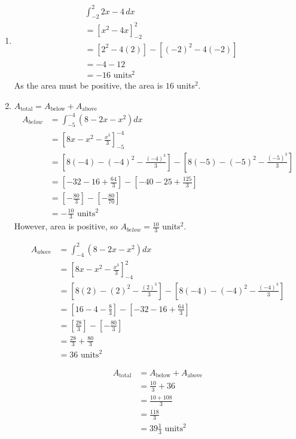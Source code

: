\begin{enumerate}
	\item
	\begin{align*}
		&\int_{-2}^{2} 2x-4 \, dx\\
		&=\left[ x^2-4x \right]_{-2}^2\\
		&=\left[ 2^2-4\left(2\right) \right] - \left[ \left(-2\right)^2-4\left(-2\right) \right]\\
		&=-4-12\\
		&=-16 \text{ units}^2
	\end{align*}
	As the area must be positive, the area is $16$ units$^2$.
	
	\item
	$A_{\text{total}} = A_{\text{below}} + A_{\text{above}}$
	\begin{align*}
		A_{below} &= \int_{-5}^{-4} (8-2x-x^2) dx\\
		&= \left[ 8x-x^2-\frac{x^3}{3} \right]_{-5}^{-4}\\
		&= \left[ 8\left(-4\right) - \left(-4\right)^2 - \frac{(-4)^3}{3} \right] - \left[ 8\left(-5\right) - \left(-5\right)^2 - \frac{(-5)^3}{3} \right]\\
		&= \left[ -32-16 + \frac{64}{3} \right] - \left[ -40-25 + \frac{125}{3} \right]\\
		&= \left[ -\frac{80}{3} \right] - \left[ -\frac{80}{70}\right]\\
		&= -\frac{10}{3} \text{ units}^2
	\end{align*}
	However, area is positive, so $A_{below} = \frac{10}{3}$ units$^2$.
	
	\begin{align*}
		A_{above} &= \int_{-4}^{2} (8-2x-x^2) dx\\
		&= \left[ 8x-x^2-\frac{x^3}{3} \right]_{-4}^{2}\\
		&= \left[ 8\left(2\right) - \left(2\right)^2 - \frac{(2)^3}{3} \right] - \left[ 8\left(-4\right) - \left(-4\right)^2 - \frac{(-4)^3}{3} \right]\\
		&= \left[ 16-4 - \frac{8}{3} \right] - \left[ -32-16 + \frac{64}{3} \right]\\
		&= \left[ \frac{28}{3} \right] - \left[ -\frac{80}{3}\right]\\
		&= \frac{28}{3} + \frac{80}{3}\\
		&= 36 \text{ units}^2
	\end{align*}
	
	\begin{align*}
		A_{\text{total}} &= A_{\text{below}} + A_{\text{above}}\\
		&= \frac{10}{3} + 36\\
		&= \frac{10+108}{3}\\
		&= \frac{118}{3}\\
		&= 39\frac{1}{3} \text{ units}^2
	\end{align*}
\end{enumerate}